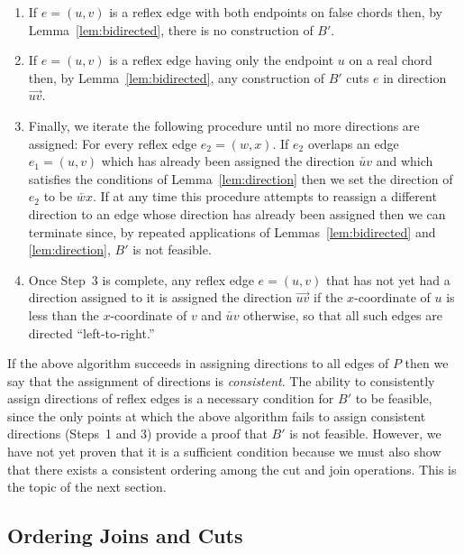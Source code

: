 \documentclass{elsart}
\begin{document}
\begin{enumerate}
\item If $e=(u,v)$ is a reflex edge with both endpoints on false
  chords then, by Lemma~\ref{lem:bidirected}, there is no construction
  of $B'$.

\item If $e=(u,v)$ is a reflex edge having only the endpoint $u$ on a
  real chord then, by Lemma~\ref{lem:bidirected}, any construction
  of $B'$ cuts $e$ in direction $\overrightarrow{uv}$.

\item Finally, we iterate the following procedure until no more
  directions are assigned: For every reflex edge $e_2=(w,x)$. If $e_2$
  overlaps an edge $e_1=(u,v)$ which has already been assigned the
  direction $\overleftarrow{uv}$ and which satisfies the conditions of
  Lemma~\ref{lem:direction} then we set the direction of $e_2$ to be
  $\overleftarrow{wx}$.  If at any time this procedure attempts to
  reassign a different direction to an edge whose direction has
  already been assigned then we can terminate since, by repeated
  applications of Lemmas~\ref{lem:bidirected} and
  \ref{lem:direction}, $B'$ is not feasible.

\item Once Step~3 is complete, any reflex edge $e=(u,v)$ that has not
  yet had a direction assigned to it is assigned the direction
  $\overrightarrow{uv}$ if the $x$-coordinate of $u$ is less than the
  $x$-coordinate of $v$ and $\overleftarrow{uv}$ otherwise, so that
  all such edges are directed ``left-to-right.''
\end{enumerate}

If the above algorithm succeeds in assigning directions to all edges
of $P$ then we say that the assignment of directions is
\emph{consistent}. The ability to consistently assign directions of
reflex edges is a necessary condition for $B'$ to be feasible, since
the only points at which the above algorithm fails to assign
consistent directions (Steps~1 and 3) provide a proof that $B'$ is not
feasible.  However, we have not yet proven that it is a sufficient
condition because we must also show that there exists a consistent
ordering among the cut and join operations.  This is the topic of the
next section.


\subsection{Ordering Joins and Cuts}
\end{document}
